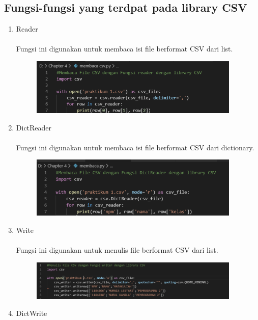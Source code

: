 \documentclass{article}
\begin{document}
    \subsection{Fungsi-fungsi yang terdpat pada library CSV}
        \begin{enumerate}
            \item Reader
                \paragraph{} Fungsi ini digunakan untuk membaca isi file berformat CSV dari list.
                \newpage\begin{figure}[ht]
                \centerline{\includegraphics[width=10cm]{figure/3.PNG}}
            \end{figure}
            \item DictReader
                \paragraph{}  Fungsi ini digunakan untuk membaca isi file berformat CSV dari dictionary.
                \begin{figure}[ht]
                \centerline{\includegraphics[width=10cm]{figure/4.PNG}}
            \end{figure}
            \item Write
                \paragraph{} Fungsi ini digunakan untuk menulis file berformat CSV dari list.
                 \begin{figure}[ht]
                \centerline{\includegraphics[width=10cm]{figure/5.PNG}}
            \end{figure}
            \newpage\item DictWrite

\end{enumerate}
\end{document}
